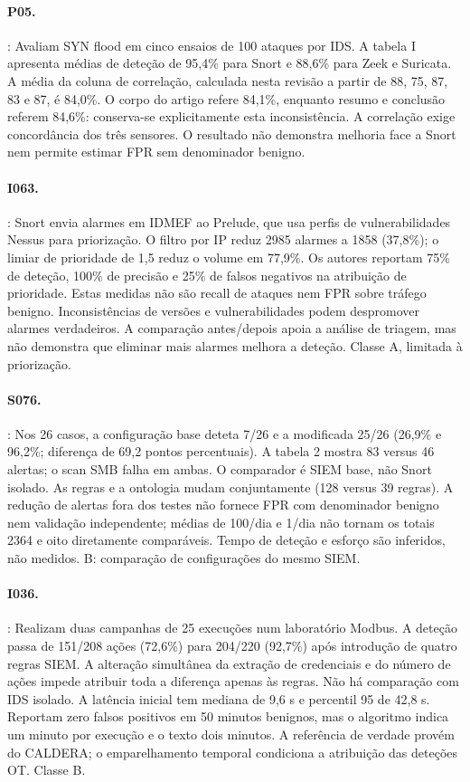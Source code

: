 \documentclass[11pt,a4paper]{article}
\begin{document}
\paragraph{P05.} \citet{maliki2024}: Avaliam SYN flood em cinco ensaios de 100 ataques por IDS. A tabela I apresenta médias de deteção de 95,4\% para Snort e 88,6\% para Zeek e Suricata. A média da coluna de correlação, calculada nesta revisão a partir de 88, 75, 87, 83 e 87, é 84,0\%. O corpo do artigo refere 84,1\%, enquanto resumo e conclusão referem 84,6\%: conserva-se explicitamente esta inconsistência. A correlação exige concordância dos três sensores. O resultado não demonstra melhoria face a Snort nem permite estimar FPR sem denominador benigno.

\paragraph{I063.} \citet{hybridalarms2019}: Snort envia alarmes em IDMEF ao Prelude, que usa perfis de vulnerabilidades Nessus para priorização. O filtro por IP reduz 2985 alarmes a 1858 (37,8\%); o limiar de prioridade de 1,5 reduz o volume em 77,9\%. Os autores reportam 75\% de deteção, 100\% de precisão e 25\% de falsos negativos na atribuição de prioridade. Estas medidas não são recall de ataques nem FPR sobre tráfego benigno. Inconsistências de versões e vulnerabilidades podem despromover alarmes verdadeiros. A comparação antes/depois apoia a análise de triagem, mas não demonstra que eliminar mais alarmes melhora a deteção. Classe A, limitada à priorização.

\paragraph{S076.} \citet{bryant2020}: Nos 26 casos, a configuração base deteta 7/26 e a modificada 25/26 (26,9\% e 96,2\%; diferença de 69,2 pontos percentuais). A tabela 2 mostra 83 versus 46 alertas; o scan SMB falha em ambas. O comparador é SIEM base, não Snort isolado. As regras e a ontologia mudam conjuntamente (128 versus 39 regras). A redução de alertas fora dos testes não fornece FPR com denominador benigno nem validação independente; médias de 100/dia e 1/dia não tornam os totais 2364 e oito diretamente comparáveis. Tempo de deteção e esforço são inferidos, não medidos. B: comparação de configurações do mesmo SIEM.

\paragraph{I036.} \citet{otrobustness2026}: Realizam duas campanhas de 25 execuções num laboratório Modbus. A deteção passa de 151/208 ações (72,6\%) para 204/220 (92,7\%) após introdução de quatro regras SIEM. A alteração simultânea da extração de credenciais e do número de ações impede atribuir toda a diferença apenas às regras. Não há comparação com IDS isolado. A latência inicial tem mediana de 9,6 s e percentil 95 de 42,8 s. Reportam zero falsos positivos em 50 minutos benignos, mas o algoritmo indica um minuto por execução e o texto dois minutos. A referência de verdade provém do CALDERA; o emparelhamento temporal condiciona a atribuição das deteções OT. Classe B.
\end{document}
